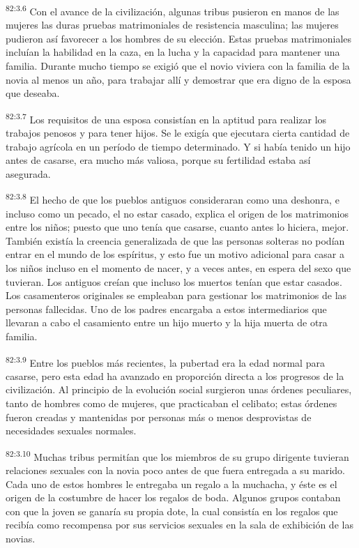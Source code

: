 \documentclass[twoside, 11pt]{book}
\begin{document}
\par
\textsuperscript{82:3.6} Con el avance de la civilización, algunas tribus pusieron en manos de las mujeres las duras pruebas matrimoniales de resistencia masculina; las mujeres pudieron así favorecer a los hombres de su elección. Estas pruebas matrimoniales incluían la habilidad en la caza, en la lucha y la capacidad para mantener una familia. Durante mucho tiempo se exigió que el novio viviera con la familia de la novia al menos un año, para trabajar allí y demostrar que era digno de la esposa que deseaba.

\par
\textsuperscript{82:3.7} Los requisitos de una esposa consistían en la aptitud para realizar los trabajos penosos y para tener hijos. Se le exigía que ejecutara cierta cantidad de trabajo agrícola en un período de tiempo determinado. Y si había tenido un hijo antes de casarse, era mucho más valiosa, porque su fertilidad estaba así asegurada.

\par
\textsuperscript{82:3.8} El hecho de que los pueblos antiguos consideraran como una deshonra, e incluso como un pecado, el no estar casado, explica el origen de los matrimonios entre los niños; puesto que uno tenía que casarse, cuanto antes lo hiciera, mejor. También existía la creencia generalizada de que las personas solteras no podían entrar en el mundo de los espíritus, y esto fue un motivo adicional para casar a los niños incluso en el momento de nacer, y a veces antes, en espera del sexo que tuvieran. Los antiguos creían que incluso los muertos tenían que estar casados. Los casamenteros originales se empleaban para gestionar los matrimonios de las personas fallecidas. Uno de los padres encargaba a estos intermediarios que llevaran a cabo el casamiento entre un hijo muerto y la hija muerta de otra familia.

\par
\textsuperscript{82:3.9} Entre los pueblos más recientes, la pubertad era la edad normal para casarse, pero esta edad ha avanzado en proporción directa a los progresos de la civilización. Al principio de la evolución social surgieron unas órdenes peculiares, tanto de hombres como de mujeres, que practicaban el celibato; estas órdenes fueron creadas y mantenidas por personas más o menos desprovistas de necesidades sexuales normales.

\par
\textsuperscript{82:3.10} Muchas tribus permitían que los miembros de su grupo dirigente tuvieran relaciones sexuales con la novia poco antes de que fuera entregada a su marido. Cada uno de estos hombres le entregaba un regalo a la muchacha, y éste es el origen de la costumbre de hacer los regalos de boda. Algunos grupos contaban con que la joven se ganaría su propia dote, la cual consistía en los regalos que recibía como recompensa por sus servicios sexuales en la sala de exhibición de las novias.
\end{document}
